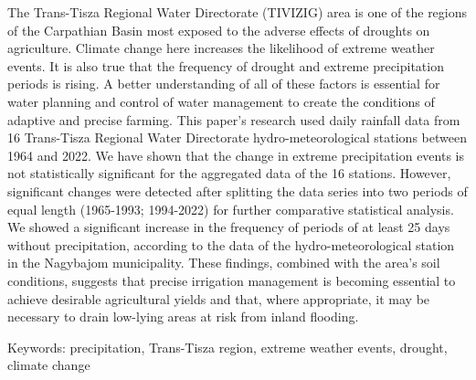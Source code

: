 \noindent

The Trans-Tisza Regional Water Directorate (TIVIZIG) area is one of the regions of the Carpathian Basin most exposed to the adverse effects of droughts on agriculture. Climate change here increases the likelihood of extreme weather events. It is also true that the frequency of drought and extreme precipitation periods is rising. A better understanding of all of these factors is essential for water planning and control of water management to create the conditions of adaptive and precise farming. This paper's research used daily rainfall data from 16 Trans-Tisza Regional Water Directorate hydro-meteorological stations between 1964 and 2022. We have shown that the change in extreme precipitation events is not statistically significant for the aggregated data of the 16 stations. However, significant changes were detected after splitting the data series into two periods of equal length (1965-1993; 1994-2022) for further comparative statistical analysis. We showed a significant increase in the frequency of periods of at least 25 days without precipitation, according to the data of the hydro-meteorological station in the Nagybajom municipality. These findings, combined with the area's soil conditions, suggests that precise irrigation management is becoming essential to achieve desirable agricultural yields and that, where appropriate, it may be necessary to drain low-lying areas at risk from inland flooding.

Keywords: precipitation, Trans-Tisza region, extreme weather events, drought, climate change
\newpage{}
{}
\begin{flushleft}






\end{flushleft}


